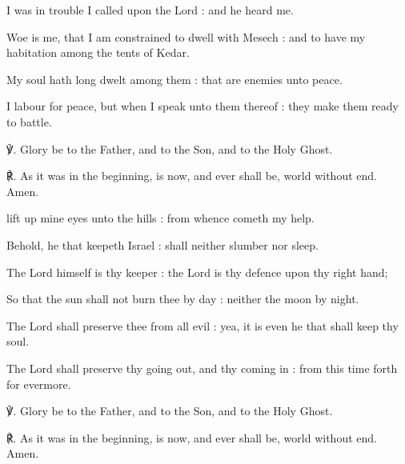 \begin{multicols}{2}
 I was in trouble I called upon the Lord : and he heard me.\par
{}
Woe is me, that I am constrained to dwell with Mesech : and to have my habitation among the tents of Kedar.\par
{}My soul hath long dwelt among them : that are enemies unto peace.\par
{}I labour for peace, but when I speak unto them thereof : they make them ready to battle.\par
℣. Glory be to the Father, and to the Son, and to the Holy Ghost.\par
℟. As it was in the beginning, is now, and ever shall be, world without end. Amen.


 lift up mine eyes unto the hills : from whence cometh my help.\par
{}
Behold, he that keepeth Israel : shall neither slumber nor sleep.\par
{}The Lord himself is thy keeper : the Lord is thy defence upon thy right hand;\par
{}So that the sun shall not burn thee by day : neither the moon by night.\par
{}The Lord shall preserve thee from all evil : yea, it is even he that shall keep thy soul.\par
{}The Lord shall preserve thy going out, and thy coming in : from this time forth for evermore.\par
℣. Glory be to the Father, and to the Son, and to the Holy Ghost.\par
℟. As it was in the beginning, is now, and ever shall be, world without end. Amen.



\end{multicols}
